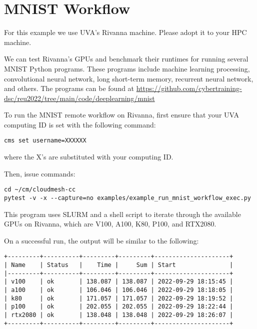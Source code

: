 \section{MNIST Workflow}\label{mnist-workflow}

For this example we use UVA's Rivanna machine. Please adopt it to your
HPC machine.

We can test Rivanna's GPUs and benchmark their runtimes for running
several MNIST Python programs. These programs include machine learning
processing, convolutional neural network, long short-term memory,
recurrent neural network, and others. The programs can be found at
\url{https://github.com/cybertraining-dsc/reu2022/tree/main/code/deeplearning/mnist}

To run the MNIST remote workflow on Rivanna, first ensure that your UVA
computing ID is set with the following command:

\begin{verbatim}
cms set username=XXXXXX
\end{verbatim}

where the X's are substituted with your computing ID.

Then, issue commands:

\begin{verbatim}
cd ~/cm/cloudmesh-cc
pytest -v -x --capture=no examples/example_run_mnist_workflow_exec.py
\end{verbatim}

This program uses SLURM and a shell script to iterate through the
available GPUs on Rivanna, which are V100, A100, K80, P100, and RTX2080.

On a successful run, the output will be similar to the following:

\begin{verbatim}
+---------+----------+---------+---------+---------------------+
| Name    | Status   |    Time |     Sum | Start               |
|---------+----------+---------+---------+---------------------+
| v100    | ok       | 138.087 | 138.087 | 2022-09-29 18:15:45 |
| a100    | ok       | 106.046 | 106.046 | 2022-09-29 18:18:05 |
| k80     | ok       | 171.057 | 171.057 | 2022-09-29 18:19:52 |
| p100    | ok       | 202.055 | 202.055 | 2022-09-29 18:22:44 |
| rtx2080 | ok       | 138.048 | 138.048 | 2022-09-29 18:26:07 |
+---------+----------+---------+---------+---------------------+
\end{verbatim}

